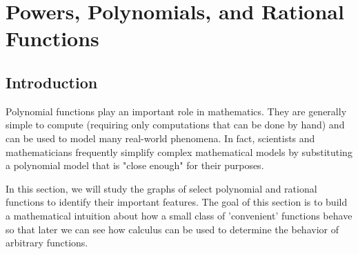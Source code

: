 \section{Powers, Polynomials, and Rational Functions} \label{S.0.6.PowersPolysRationals}


\vspace*{-14 pt}



\nin \hrulefill


\subsection*{Introduction}

Polynomial functions play an important role in mathematics.  They are generally simple to compute (requiring only computations that can be done by hand) and can be used to model many real-world phenomena.  In fact, scientists and mathematicians frequently simplify complex mathematical models by substituting a polynomial model that is "close enough" for their purposes.

In this section, we will study the graphs of select polynomial and rational functions to identify their important features.  The goal of this section is to build a mathematical intuition about how a small class of 'convenient' functions behave so that later we can see how calculus can be used to determine the behavior of arbitrary functions.


